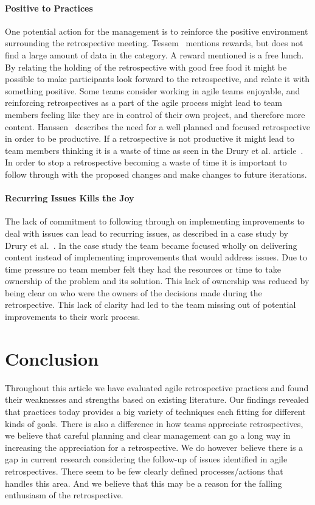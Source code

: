 \documentclass[12pt]{article}
\begin{document}
\paragraph{Positive to Practices}
One potential action for the management is to reinforce the positive environment surrounding the retrospective meeting. Tessem~\cite{Tessem2014} mentions rewards, but does not find a large amount of data in the category. A reward mentioned is a free lunch. By relating the holding of the retrospective with good free food it might be possible to make participants look forward to the retrospective, and relate it with something positive. Some teams consider working in agile teams enjoyable, and reinforcing retrospectives as a part of the agile process might lead to team members feeling like they are in control of their own project, and therefore more content. Hanssen~\cite{Hanssen2003} describes the need for a well planned and focused retrospective in order to be productive. If a retrospective is not productive it might lead to team members  thinking it is a waste of time as seen in the Drury et al. article~\cite{Drury2012}. In order to stop a retrospective becoming a waste of time it is important to follow through with the proposed changes and make changes to future iterations.

\paragraph{Recurring Issues Kills the Joy}
The lack of commitment to following through on implementing improvements to deal with issues can lead to recurring issues, as described in a case study by Drury et al.~\cite{Drury2012}. In the case study the team became focused wholly on delivering content instead of implementing improvements that would address issues. Due to time pressure no team member felt they had the resources or time to take ownership of the problem and its solution. This lack of ownership was reduced by being clear on who were the owners of the decisions made during the retrospective. This lack of clarity had led to the team missing out of potential improvements to their work process. 

\section{Conclusion}
Throughout this article we have evaluated agile retrospective practices and found their weaknesses and strengths based on existing literature. Our findings revealed that practices today provides a big variety of techniques each fitting for different kinds of goals. There is also a difference in how teams appreciate retrospectives, we believe that careful planning and clear management can go a long way in increasing the appreciation for a retrospective. We do however believe there is a gap in current research considering the follow-up of issues identified in agile retrospectives. There seem to be few clearly defined processes/actions that handles this area. And we believe that this may be a reason for the falling enthusiasm of the retrospective. 
\end{document}

